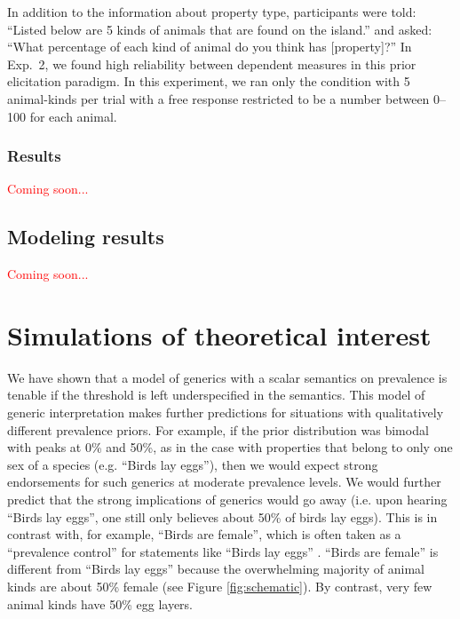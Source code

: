 \documentclass[10pt,letterpaper]{article}
\newcommand{\red}[1]{\textcolor{Red}{#1}}
\begin{document}
In addition to the information about property type, participants were told: ``Listed below are 5 kinds of animals that are found on the island.'' and asked: ``What percentage of each kind of animal do you think has [property]?'' In Exp.~2, we found high reliability between dependent measures in this prior elicitation paradigm. In this experiment, we ran only the condition with 5 animal-kinds per trial with a free response restricted to be a number between 0--100 for each animal.


\subsubsection{Results}

\red{Coming soon...}

\subsection{Modeling results}

\red{Coming soon...}

\section{Simulations of theoretical interest}

We have shown that a model of generics with a scalar semantics on prevalence is tenable if the threshold is left underspecified in the semantics. This model of generic interpretation makes further predictions for situations with qualitatively different prevalence priors. For example, if the prior distribution was bimodal with peaks at 0\% and 50\%, as in the case with properties that belong to only one sex of a species (e.g. ``Birds lay eggs''), then we would expect strong endorsements for such generics at moderate prevalence levels. We would further predict that the strong implications of generics would go away (i.e. upon hearing ``Birds lay eggs'', one still only believes about 50\% of birds lay eggs). This is in contrast with, for example, ``Birds are female'', which is often taken as a ``prevalence control'' for statements like ``Birds lay eggs'' \cite{Khemlani2009, Brandone2012}. ``Birds are female'' is different from ``Birds lay eggs'' because the overwhelming majority of animal kinds are about 50\% female (see Figure \ref{fig:schematic}). By contrast, very few animal kinds have 50\% egg layers. 
\end{document}
